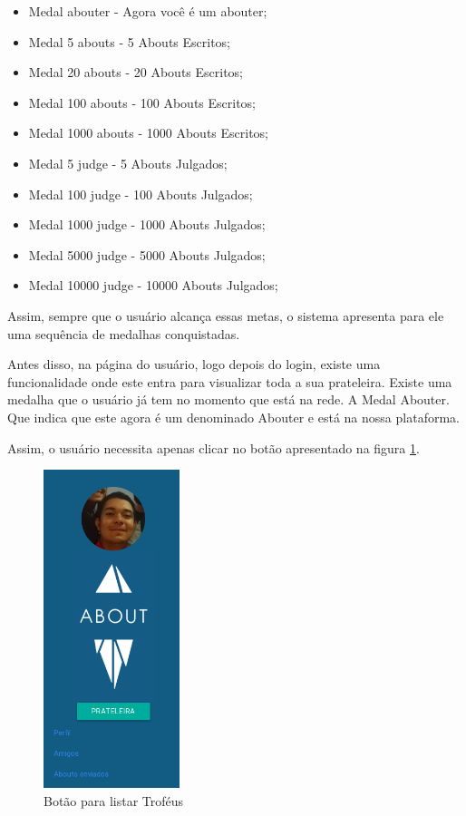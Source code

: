 \begin{itemize}
    \item Medal abouter - Agora você é um abouter;
    \item Medal 5 abouts - 5 Abouts Escritos;
    \item Medal 20 abouts - 20 Abouts Escritos;
    \item Medal 100 abouts - 100 Abouts Escritos;
    \item Medal 1000 abouts - 1000 Abouts Escritos;
    \item Medal 5 judge - 5 Abouts Julgados;
    \item Medal 100 judge - 100 Abouts Julgados;
    \item Medal 1000 judge - 1000 Abouts Julgados;
    \item Medal 5000 judge - 5000 Abouts Julgados;
    \item Medal 10000 judge - 10000 Abouts Julgados;
\end{itemize}

Assim, sempre que o usuário alcança essas metas, o sistema apresenta para ele uma sequência de medalhas
conquistadas.

Antes disso, na página do usuário, logo depois do login, existe uma funcionalidade onde este entra para visualizar toda a sua prateleira.
Existe uma medalha que o usuário já tem no momento que está na rede. A Medal Abouter. Que indica que este
agora é um denominado Abouter e está na nossa plataforma.

Assim, o usuário necessita apenas clicar no botão apresentado na figura \ref{fig:about_trofeus}.

\begin{figure}[h]
    \centering
    \includegraphics[width=150px, scale=1]{figuras/about_trofeus}
    \caption{Botão para listar Troféus}
    \label{fig:about_trofeus}
\end{figure}

